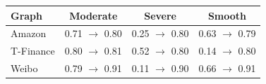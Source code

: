 \begin{tabular}{lccc}
\toprule
Graph & Moderate & Severe & Smooth\\
\midrule
Amazon & 0.71 $\to$ 0.80 & 0.25 $\to$ 0.80 & 0.63 $\to$ 0.79\\
T-Finance & 0.80 $\to$ 0.81 & 0.52 $\to$ 0.80 & 0.14 $\to$ 0.80\\
Weibo & 0.79 $\to$ 0.91 & 0.11 $\to$ 0.90 & 0.66 $\to$ 0.91\\
\bottomrule
\end{tabular}
